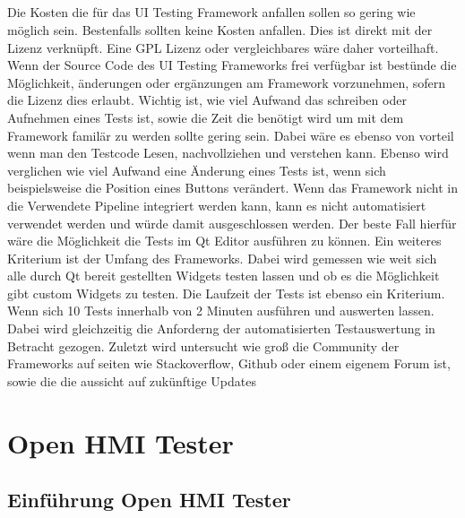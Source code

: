 		\paragraph{} Die Kosten die für das UI Testing Framework anfallen sollen so gering wie möglich sein. Bestenfalls sollten keine Kosten anfallen. Dies ist direkt mit der Lizenz verknüpft. Eine GPL Lizenz oder vergleichbares wäre daher vorteilhaft. Wenn der Source Code des UI Testing Frameworks frei verfügbar ist bestünde die Möglichkeit, änderungen oder ergänzungen am Framework vorzunehmen, sofern die Lizenz dies erlaubt. 
		Wichtig ist, wie viel Aufwand das schreiben oder Aufnehmen eines Tests ist, sowie die Zeit die benötigt wird um mit dem Framework familär zu werden sollte gering sein. Dabei wäre es ebenso von vorteil wenn man den Testcode Lesen, nachvollziehen und verstehen kann. Ebenso wird verglichen wie viel Aufwand eine Änderung eines Tests ist, wenn sich beispielsweise die Position eines Buttons verändert. Wenn das Framework nicht in die Verwendete Pipeline integriert werden kann, kann es nicht automatisiert verwendet werden und würde damit ausgeschlossen werden. Der beste Fall hierfür wäre die Möglichkeit die Tests im Qt Editor ausführen zu können. Ein weiteres Kriterium ist der Umfang des Frameworks. Dabei wird gemessen wie weit sich alle durch Qt bereit gestellten Widgets testen lassen und ob es die Möglichkeit gibt custom Widgets zu testen. Die Laufzeit der Tests ist ebenso ein Kriterium. Wenn sich 10 Tests innerhalb von 2 Minuten ausführen und auswerten lassen. Dabei wird gleichzeitig die Anforderng der automatisierten Testauswertung in Betracht gezogen. Zuletzt wird untersucht wie groß die Community der Frameworks auf seiten wie Stackoverflow, Github oder einem eigenem Forum ist, sowie die die aussicht auf zukünftige Updates
		

\chapter{Open HMI Tester}
		
		\section{Einführung Open HMI Tester}
